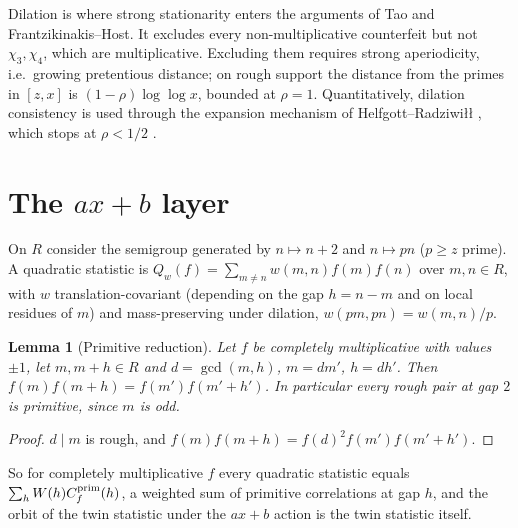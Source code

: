 \documentclass[11pt]{amsart}
\newtheorem{lemma}[theorem]{Lemma}
\theoremstyle{definition}
\theoremstyle{remark}
\begin{document}
Dilation is where strong stationarity enters the arguments of Tao \cite{Tao16} and Frantzikinakis--Host. It excludes every non-multiplicative counterfeit but not $\chi_3,\chi_4$, which are multiplicative. Excluding them requires strong aperiodicity, i.e.\ growing pretentious distance; on rough support the distance from the primes in $[z,x]$ is $(1-\rho)\log\log x$, bounded at $\rho=1$. Quantitatively, dilation consistency is used through the expansion mechanism of Helfgott--Radziwi\l{}\l{} \cite{HR21}, which stops at $\rho<1/2$ \cite{Wan26c}.

\section{The $ax+b$ layer}\label{sec:axb}

On $R$ consider the semigroup generated by $n\mapsto n+2$ and $n\mapsto pn$ ($p\ge z$ prime). A quadratic statistic is $Q_w(f)=\sum_{m\ne n}w(m,n)f(m)f(n)$ over $m,n\in R$, with $w$ translation-covariant (depending on the gap $h=n-m$ and on local residues of $m$) and mass-preserving under dilation, $w(pm,pn)=w(m,n)/p$.

\begin{lemma}[Primitive reduction]\label{lem:primitive}
Let $f$ be completely multiplicative with values $\pm1$, let $m,m+h\in R$ and $d=\gcd(m,h)$, $m=dm'$, $h=dh'$. Then $f(m)f(m+h)=f(m')f(m'+h')$. In particular every rough pair at gap $2$ is primitive, since $m$ is odd.
\end{lemma}

\begin{proof}
$d\mid m$ is rough, and $f(m)f(m+h)=f(d)^2f(m')f(m'+h')$.
\end{proof}

So for completely multiplicative $f$ every quadratic statistic equals $\sum_hW(h)C^{\rm prim}_f(h)$, a weighted sum of primitive correlations at gap $h$, and the orbit of the twin statistic under the $ax+b$ action is the twin statistic itself.
\end{document}
